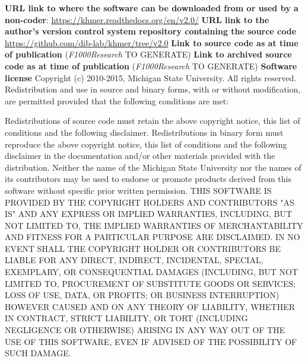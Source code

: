 \documentclass[10pt,a4paper]{article}
\begin{document}
\textbf{URL link to where the software can be downloaded from or used by a non-coder}: 
\newline\url{https://khmer.readthedocs.org/en/v2.0/}
\newline\textbf{URL link to the author's version control system repository containing the source code}
\newline\url{https://github.com/dib-lab/khmer/tree/v2.0}
\newline\textbf{Link to source code as at time of publication} 
\newline({\textit{F1000Research}} TO GENERATE)
\newline\textbf{Link to archived source code as at time of publication} 
\newline({\textit{F1000Research}} TO GENERATE)
\newline\textbf{Software license}
\newline Copyright (c) 2010-2015, Michigan State University. All rights reserved.
%
%
Redistribution and use in source and binary forms, with or without modification, are permitted provided that the following conditions are met:

Redistributions of source code must retain the above copyright notice, this list of conditions and the following disclaimer.
Redistributions in binary form must reproduce the above copyright notice, this list of conditions and the following disclaimer in the documentation and/or other materials provided with the distribution.
Neither the name of the Michigan State University nor the names of its contributors may be used to endorse or promote products derived from this software without specific prior written permission.
THIS SOFTWARE IS PROVIDED BY THE COPYRIGHT HOLDERS AND CONTRIBUTORS "AS IS" AND ANY EXPRESS OR IMPLIED WARRANTIES, INCLUDING, BUT NOT LIMITED TO, THE IMPLIED WARRANTIES OF MERCHANTABILITY AND FITNESS FOR A PARTICULAR PURPOSE ARE DISCLAIMED. IN NO EVENT SHALL THE COPYRIGHT HOLDER OR CONTRIBUTORS BE LIABLE FOR ANY DIRECT, INDIRECT, INCIDENTAL, SPECIAL, EXEMPLARY, OR CONSEQUENTIAL DAMAGES (INCLUDING, BUT NOT LIMITED TO, PROCUREMENT OF SUBSTITUTE GOODS OR SERVICES; LOSS OF USE, DATA, OR PROFITS; OR BUSINESS INTERRUPTION) HOWEVER CAUSED AND ON ANY THEORY OF LIABILITY, WHETHER IN CONTRACT, STRICT LIABILITY, OR TORT (INCLUDING NEGLIGENCE OR OTHERWISE) ARISING IN ANY WAY OUT OF THE USE OF THIS SOFTWARE, EVEN IF ADVISED OF THE POSSIBILITY OF SUCH DAMAGE.
\end{document}
